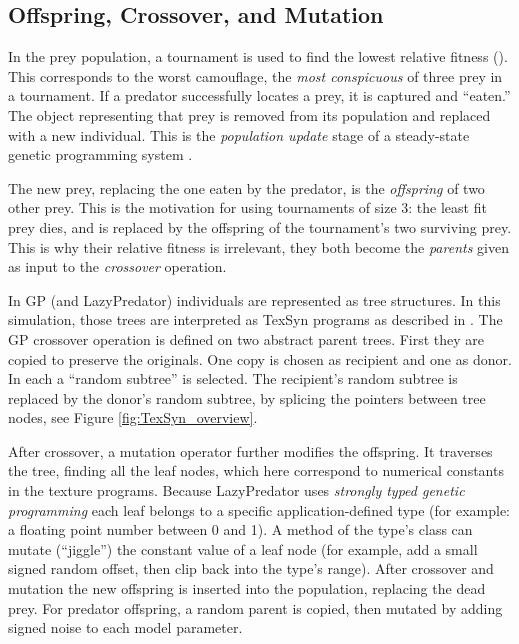 \documentclass[letterpaper]{article}
\newcommand{\jargon}[1]{\textit{#1}}
\newcommand{\texsyn}[0]{TexSyn}
\newcommand{\lazypredator}[0]{LazyPredator}
\begin{document}

\subsection{Offspring, Crossover, and Mutation}
In the prey population, a tournament is used to find the lowest relative fitness (). This corresponds to the worst camouflage, the \jargon{most conspicuous} of three prey in a tournament. If a predator successfully locates a prey, it is captured and “eaten.” The object representing that prey is removed from its population and replaced with a new individual. This is the \jargon{population update} stage of a steady-state genetic programming system \cite{syswerda_study_1991}.
\par
The new prey, replacing the one eaten by the predator, is the \jargon{offspring} of two other prey. This is the motivation for using tournaments of size 3: the least fit prey dies, and is replaced by the offspring of the tournament's two surviving prey. This is why their relative fitness is irrelevant, they both become the \jargon{parents} given as input to the \jargon{crossover} operation.
\par
In GP (and \lazypredator{}) individuals are represented as tree structures. In this simulation, those trees are interpreted as \texsyn{} programs as described in . The GP crossover operation is defined on two abstract parent trees. First they are copied to preserve the originals. One copy is chosen as recipient and one as donor. In each a “random subtree” is selected. The recipient's random subtree is replaced by the donor's random subtree, by splicing the pointers between tree nodes, see Figure \ref{fig:TexSyn_overview}.
\par
After crossover, a mutation operator further modifies the offspring. It traverses the tree, finding all the leaf nodes, which here correspond to numerical constants in the texture programs. Because \lazypredator{} uses \jargon{strongly typed genetic programming} \cite{montana_strongly_1995} each leaf belongs to a specific application-defined type (for example: a floating point number between 0 and 1). A method of the type's class can mutate (“jiggle”) the constant value of a leaf node (for example, add a small signed random offset, then clip back into the type's range). After crossover and mutation the new offspring is inserted into the population, replacing the dead prey.
For predator offspring, a random parent is copied, then mutated by adding signed noise to each model parameter.
\par
\end{document}

